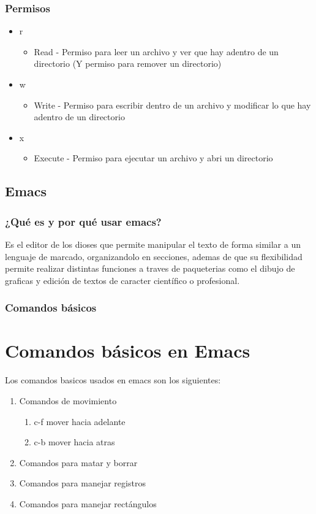\documentclass[11pt,letterpaper]{article}
\begin{document}
  \subsection{Permisos}
  \begin{itemize}
    
  \item r
    \begin{itemize}
    \item Read - Permiso para leer un archivo y ver que hay adentro de un directorio (Y permiso para remover un directorio)
    \end {itemize}
    
  \item w
    \begin {itemize}
    \item Write - Permiso para escribir dentro de un archivo y modificar lo que hay adentro de un directorio
    \end {itemize}
    
  \item x
    \begin {itemize}
    \item Execute - Permiso para ejecutar un archivo y abri un directorio
    \end {itemize}
  \end {itemize}

  
\section{Emacs}
\subsection{¿Qué es y por qué usar emacs?}
Es el editor de los dioses que permite manipular el texto de forma similar a un lenguaje de marcado, organizandolo en secciones, ademas de que su flexibilidad permite realizar distintas funciones a traves de paqueterias como el dibujo de graficas y edición de textos de caracter científico o profesional.
\subsection{Comandos básicos}
\setcounter{ćhapter}{5} 
\chapter {Comandos básicos en Emacs}
Los comandos basicos usados en emacs son los siguientes:
\begin {enumerate}
\item Comandos de movimiento
  \begin {enumerate}
    \item c-f mover hacia adelante
    \item c-b mover hacia atras
   \end {enumerate}
\item Comandos para matar y borrar
\item Comandos para manejar registros
\item Comandos para manejar rectángulos
\end{enumerate}
\end{document}
